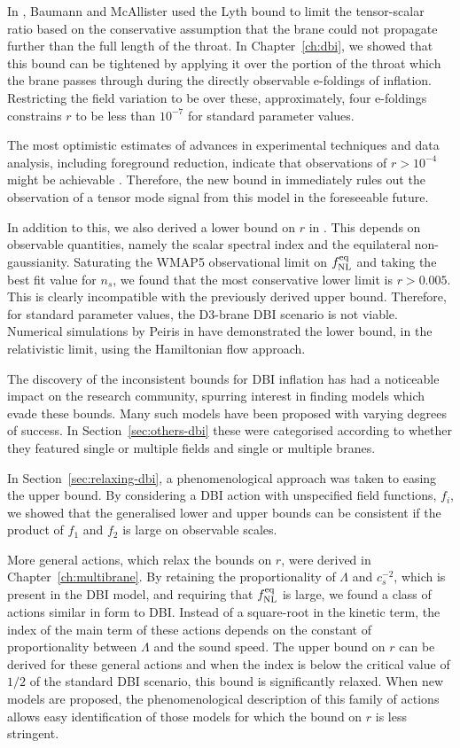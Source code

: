 In , Baumann and McAllister used the Lyth bound \cite{lyth} to limit
the tensor-scalar ratio based on the conservative assumption that the brane could
not propagate further than the full length of the throat. In Chapter~\ref{ch:dbi},
we showed that this bound can be tightened by applying it over the
portion of the throat which the brane passes through during the directly observable
e-foldings of inflation. Restricting the field variation to be over these,
approximately, four e-foldings constrains $r$ to be less than $10^{-7}$ for standard
parameter values.

The most optimistic estimates of advances in experimental techniques and data
analysis, including foreground reduction, indicate that observations of $r>10^{-4}$
might be achievable \cite{Baumann:2008aq,vpj}. Therefore, the new bound in
 immediately rules out the observation of a tensor mode signal
from this model in the foreseeable future.

In addition to this, we also derived a lower bound on $r$ in .
This depends on observable quantities, namely the scalar spectral index and the
equilateral non-gaussianity. Saturating the WMAP5 observational limit on $f_{\mathrm{NL}}^{\mathrm{eq}}$
and taking the best fit value for $n_s$, we found that the most conservative lower
limit is $r>0.005$. This is clearly incompatible with the previously derived upper
bound. Therefore, for standard parameter values, the D3-brane DBI scenario is not
viable. Numerical simulations by Peiris \etal in  have
demonstrated the lower bound, in the relativistic limit, using the
Hamiltonian flow approach.

The discovery of the inconsistent bounds for DBI inflation has had a noticeable
impact on the research community, spurring interest in finding models which evade
these bounds. Many such models have been proposed with varying degrees of success. In
Section~\ref{sec:others-dbi} these were categorised according to whether they
featured single or multiple fields and single or multiple branes. 

In Section~\ref{sec:relaxing-dbi}, a phenomenological approach was taken to easing
the upper bound. By considering a DBI action with unspecified field functions,
$f_i$, we showed that the generalised lower and upper bounds can be consistent
if the product of $f_1$ and $f_2$ is large on observable scales.


More general actions, which relax the bounds on $r$, were derived in
Chapter~\ref{ch:multibrane}. By retaining the proportionality of $\Lambda$ and
$c_s^{-2}$, which is present in the DBI model, and requiring that $f_{\mathrm{NL}}^{\mathrm{eq}}$ is large,
we found a class of actions similar in form to DBI. 
Instead of a square-root in the kinetic term, the index of the main term of these
actions depends on the constant of proportionality between $\Lambda$ and the sound
speed.
The upper bound on $r$ can be derived for these general actions and when the index
is below the critical value of $1/2$ of the standard DBI scenario, this bound is
significantly relaxed. When new models are proposed, the
phenomenological description of this family of actions allows easy identification of
those models for which the bound on $r$ is less stringent. 

